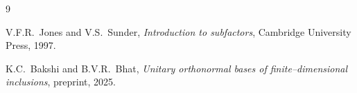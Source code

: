 \documentclass[11pt]{article}
\theoremstyle{mytheoremstyle}
\theoremstyle{definition}
\theoremstyle{remark}
\begin{document}
\begin{thebibliography}{9}

V.F.R.~Jones and V.S.~Sunder,
\emph{Introduction to subfactors},
Cambridge University Press, 1997.

K.C.~Bakshi and B.V.R.~Bhat,
\emph{Unitary orthonormal bases of finite–dimensional inclusions},
preprint, 2025.
\end{thebibliography}
\end{document}

